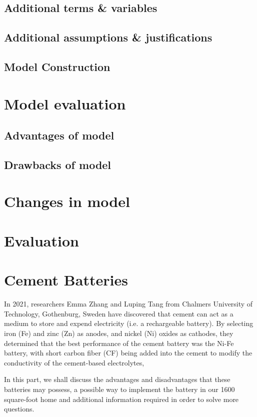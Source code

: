 \documentclass[12pt]{article}
\begin{document}
\subsection{Additional terms \& variables}

\subsection{Additional assumptions \& justifications}

\subsection{Model Construction}


\section{Model evaluation}
\subsection{Advantages of model}

\subsection{Drawbacks of model}


\section{Changes in model}

\section{Evaluation}


\section{Cement Batteries}
In 2021, researchers Emma Zhang and Luping Tang from Chalmers University of Technology, Gothenburg, Sweden\cite{buildings11030103} have discovered that cement can act as a medium to store and expend electricity (i.e. a rechargeable battery). By selecting iron (Fe) and zinc (Zn) as anodes, and nickel (Ni) oxides as cathodes, they determined that the best performance of the cement battery was the Ni-Fe battery, with short carbon fiber (CF) being added into the cement to modify the conductivity of the cement-based electrolytes,

In this part, we shall discuss the advantages and disadvantages that these batteries may possess, a possible way to implement the battery in our 1600 square-foot home and additional information required in order to solve more questions.
\end{document}

